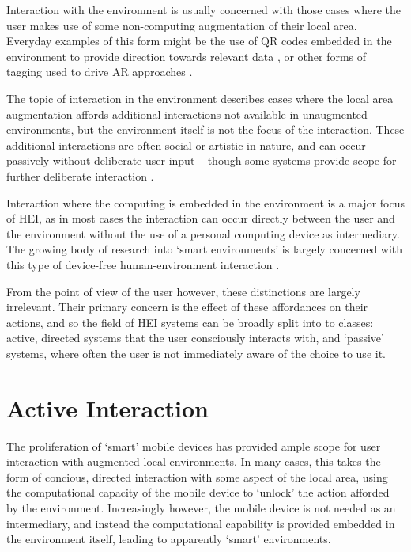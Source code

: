 \documentclass[oribibl,11pt]{llncs}
\begin{document}
Interaction with the environment is usually concerned with those cases where the user makes use of some non-computing augmentation of their local area. Everyday examples of this form might be the use of QR codes embedded in the environment to provide direction towards relevant data \cite{o2010older}, or other forms of tagging used to drive AR approaches \cite{Mandiliotis:2013:SIH:2526481.2526496}.

The topic of interaction in the environment describes cases where the local area augmentation affords additional interactions not available in unaugmented environments, but the environment itself is not the focus of the interaction. These additional interactions are often social or artistic in nature, and can occur passively without deliberate user input \cite{Nguyen:2006:MSV:1180639.1180732} -- though some systems provide scope for further deliberate interaction \cite{palmer2010bluetooth}.

Interaction where the computing is embedded in the environment is a major focus of HEI, as in most cases the interaction can occur directly between the user and the environment without the use of a personal computing device as intermediary. The growing body of research into `smart environments' is largely concerned with this type of device-free human-environment interaction \cite{Heidrich:2013:DIS:2459236.2459248}.

From the point of view of the user however, these distinctions are largely irrelevant. Their primary concern is the effect of these affordances on their actions, and so the field of HEI systems can be broadly split into to classes: active, directed systems that the user consciously interacts with, and `passive' systems, where often the user is not immediately aware of the choice to use it.


\section{Active Interaction}		\label{sec:active_interaction}

The proliferation of `smart' mobile devices has provided ample scope for user interaction with augmented local environments. In many cases, this takes the form of concious, directed interaction with some aspect of the local area, using the computational capacity of the mobile device to `unlock' the action afforded by the environment. Increasingly however, the mobile device is not needed as an intermediary, and instead the computational capability is provided embedded in the environment itself, leading to apparently `smart' environments.
\end{document}
